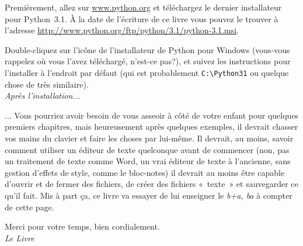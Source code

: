 Premièrement, allez sur \url{www.python.org} et téléchargez le dernier installateur pour Python~3.1. À la date de l'écriture de ce livre vous pouvez le trouver à l'adresse  \url{http://www.python.org/ftp/python/3.1/python-3.1.msi}.

Double-cliquez sur l'icône de l'installateur de Python pour Windows (vous-vous rappelez où vous l'avez téléchargé, n'est-ce pas?), et suivez les instructions pour l'installer à l'endroit par défaut (qui est probablement \verb+C:\Python31+ ou quelque chose de très similaire).\\


\textit{Après l'installation...}


... Vous pourriez avoir besoin de vous asseoir à côté de votre enfant pour quelques premiers chapitres, mais 
heureusement après quelques exemples, il devrait chasser vos mains du clavier et faire les choses par lui-même. 
Il devrait, au moins, savoir comment utiliser un éditeur de texte quelconque avant de commencer (non, pas un traitement de texte comme Word, un vrai éditeur de texte à l'ancienne, sans gestion d'effets de style, comme le bloc-notes) il devrait au moins être capable d'ouvrir et de fermer des fichiers, de créer des fichiers «~texte~» et sauvegarder ce qu'il fait. Mis à part ça, ce livre va essayer de lui enseigner le \textit{b+a, ba} à compter de cette page.

\bigskip
Merci pour votre temps, bien cordialement.\\


\textit{Le Livre}
